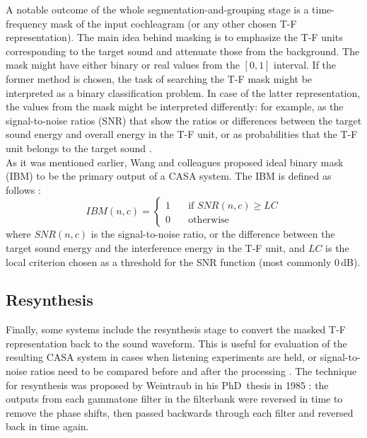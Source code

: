 A notable outcome of the whole segmentation-and-grouping stage is a time-frequency mask of the input cochleagram (or any other chosen T-F representation). The main idea behind masking is to emphasize the T-F units corresponding to the target sound and attenuate those from the background. The mask might have either binary or real values from the $[0, 1]$ interval. If the former method is chosen, the task of searching the T-F mask might be interpreted as a binary classification problem. In case of the latter representation, the values from the mask might be interpreted differently: for example, as the signal-to-noise ratios (SNR) that show the ratios or differences between the target sound energy and overall energy in the T-F unit, or as probabilities that the T-F unit belongs to the target sound \cite{Wang2006}.\\

As it was mentioned earlier, Wang and colleagues \cite{Wang2005} proposed ideal binary mask (IBM) to be the primary output of a CASA system. The IBM is defined as follows \cite{Wang2006}\cite{Wang2012}:
\begin{equation}
	IBM(n, c) = 
	\begin{cases}
		1 & \quad\text{if } SNR(n, c) \ge LC \\
		0 & \quad\text{otherwise}
	\end{cases}
\end{equation}
where $SNR(n, c)$ is the signal-to-noise ratio, or the difference between the target sound energy and the interference energy in the T-F unit, and $LC$ is the local criterion chosen as a threshold for the SNR function (most commonly 0\,dB).

\subsection{Resynthesis}\label{subsection:casa_resynthesis}

Finally, some systems include the resynthesis stage to convert the masked T-F representation back to the sound waveform. This is useful for evaluation of the resulting CASA system in cases when listening experiments are held, or signal-to-noise ratios need to be compared before and after the processing \cite{Wang2006}. The technique for resynthesis was proposed by Weintraub in his PhD~thesis in 1985 \cite{Weintraub1985}: the outputs from each gammatone filter in the filterbank were reversed in time to remove the phase shifts, then passed backwards through each filter and reversed back in time again.
